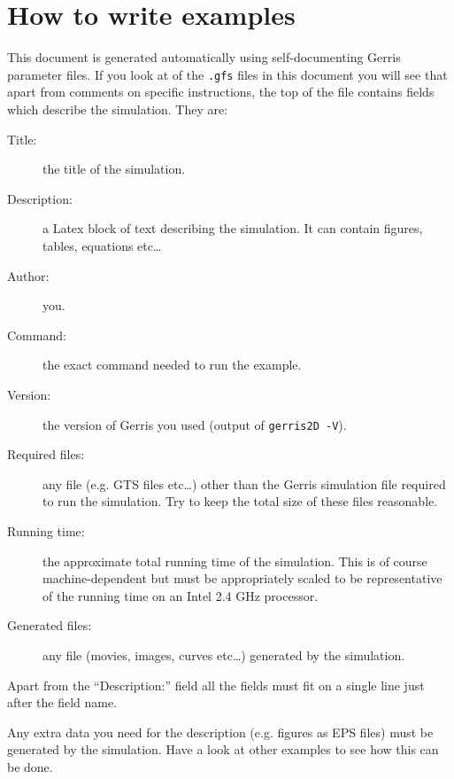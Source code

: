 \documentclass[a4paper]{article}
\begin{document}
\section{How to write examples}
\label{howto}

This document is generated automatically using self-documenting Gerris parameter files. If you look at  of the {\tt .gfs} files in this document you will see that apart from comments on specific instructions, the top of the file contains fields which describe the simulation. They are:
\begin{description}
\item[Title:] the title of the simulation.
\item[Description:] a Latex block of text describing the simulation. It can contain figures, tables, equations etc\dots
\item[Author:] you.
\item[Command:] the exact command needed to run the example.
\item[Version:] the version of Gerris you used (output of {\tt gerris2D -V}).
\item[Required files:] any file (e.g. GTS files etc\dots) other than the Gerris simulation file required to run the simulation. Try to keep the total size of these files reasonable.
\item[Running time:] the approximate total running time of the simulation. This is of course machine-dependent but must be appropriately scaled to be representative of the running time on an Intel 2.4 GHz processor.
\item[Generated files:] any file (movies, images, curves etc\dots) generated by the simulation.
\end{description}
Apart from the ``Description:'' field all the fields must fit on a single line just after the field name.

Any extra data you need for the description (e.g. figures as EPS files) must be generated by the simulation. Have a look at other examples to see how this can be done.
\end{document}

